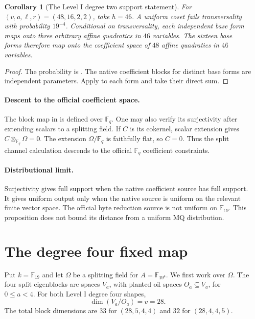 \documentclass[11pt]{article}
\newcommand{\F}{\mathbb F}
\theoremstyle{plain}
\newtheorem{corollary}[theorem]{Corollary}
\theoremstyle{definition}
\theoremstyle{remark}
\begin{document}
\begin{corollary}[The Level I degree two support statement]
\label{cor:l2-level1}
For $(v,o,\ell,r)=(48,16,2,2)$, take $h=46$.  A uniform coset fails
transversality with probability $19^{-4}$.  Conditional on transversality,
each independent base form maps onto three arbitrary affine quadratics in
$46$ variables.  The sixteen base forms therefore map onto the coefficient
space of $48$ affine quadratics in $46$ variables.
\end{corollary}

\begin{proof}
The probability is .  The native coefficient blocks
for distinct base forms are independent parameters.  Apply
 to each form and take their direct sum.
\end{proof}

\paragraph{Descent to the official coefficient space.}
The block map in  is defined over $\F_q$.  One may
also verify its surjectivity after extending scalars to a splitting field.
If $C$ is its cokernel, scalar extension gives $C\otimes_{\F_q}\Omega=0$.
The extension $\Omega/\F_q$ is faithfully flat, so $C=0$.  Thus the split
channel calculation descends to the official $\F_q$ coefficient constraints.

\paragraph{Distributional limit.}
Surjectivity gives full support when the native coefficient source has full
support.  It gives uniform output only when the native source is uniform on
the relevant finite vector space.  The official byte reduction source is not
uniform on $\F_{19}$.  This proposition does not bound its distance from a
uniform MQ distribution.

\section{The degree four fixed map}
\label{sec:l4}

Put $k=\F_{19}$ and let $\Omega$ be a splitting field for
$A=\F_{19^4}$.  We first work over $\Omega$.  The four split eigenblocks are
spaces $V_a$, with planted oil spaces $O_a\subseteq V_a$, for
$0\leq a<4$.  For both Level I degree four shapes,
\[
  \dim(V_a/O_a)=v=28.
\]
The total block dimensions are $33$ for $(28,5,4,4)$ and $32$ for
$(28,4,4,5)$.
\end{document}

